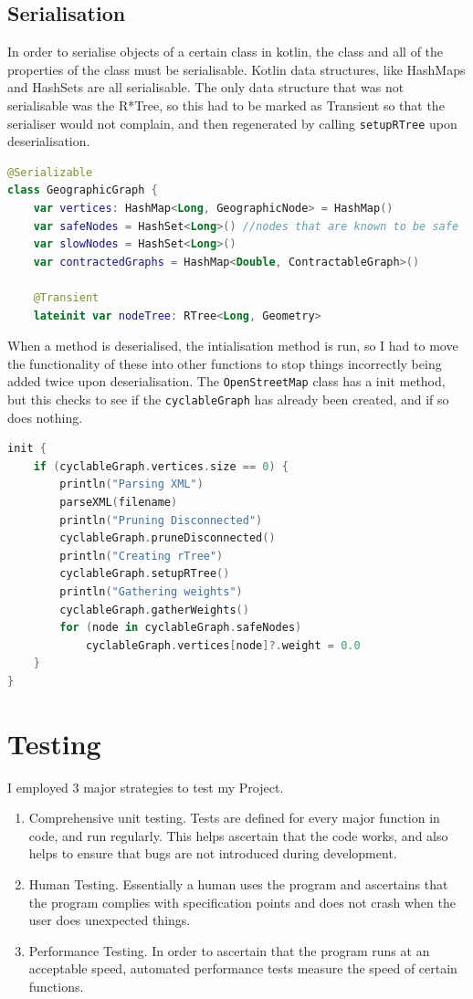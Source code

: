 \documentclass[11pt,twoside,a4paper]{article}
\begin{document}
\subsection{Serialisation}
In order to serialise objects of a certain class in kotlin, the class and all of the properties of the class must be serialisable. Kotlin data structures, like HashMaps and HashSets are all serialisable.
The only data structure that was not serialisable was the R*Tree, so this had to be marked as Transient so that the serialiser would not complain, and then regenerated by calling \texttt{setupRTree} upon deserialisation.
\begin{lstlisting}[language=kotlin]
@Serializable
class GeographicGraph {
    var vertices: HashMap<Long, GeographicNode> = HashMap()
    var safeNodes = HashSet<Long>() //nodes that are known to be safe
    var slowNodes = HashSet<Long>()
    var contractedGraphs = HashMap<Double, ContractableGraph>()

    @Transient
    lateinit var nodeTree: RTree<Long, Geometry>
\end{lstlisting}
When a method is deserialised, the intialisation method is run, so I had to move the functionality of these into other functions to stop things incorrectly being added twice upon deserialisation.
The \texttt{OpenStreetMap} class has a init method, but this checks to see if the \texttt{cyclableGraph} has already been created, and if so does nothing.
\begin{lstlisting}[language=kotlin]
init {
    if (cyclableGraph.vertices.size == 0) {
        println("Parsing XML")
        parseXML(filename)
        println("Pruning Disconnected")
        cyclableGraph.pruneDisconnected()
        println("Creating rTree")
        cyclableGraph.setupRTree()
        println("Gathering weights")
        cyclableGraph.gatherWeights()
        for (node in cyclableGraph.safeNodes)
            cyclableGraph.vertices[node]?.weight = 0.0
    }
}
\end{lstlisting}
\newpage
\section{Testing}
I employed 3 major strategies to test my Project.
\begin{enumerate}
    \item Comprehensive unit testing. Tests are defined for every major function in code, and run regularly. This helps ascertain that the code works, and also helps to ensure that bugs are not introduced during development.
    \item Human Testing. Essentially a human uses the program and ascertains that the program complies with specification points and does not crash when the user does unexpected things.
    \item Performance Testing. In order to ascertain that the program runs at an acceptable speed, automated performance tests measure the speed of certain functions.
\end{enumerate}
\end{document}
